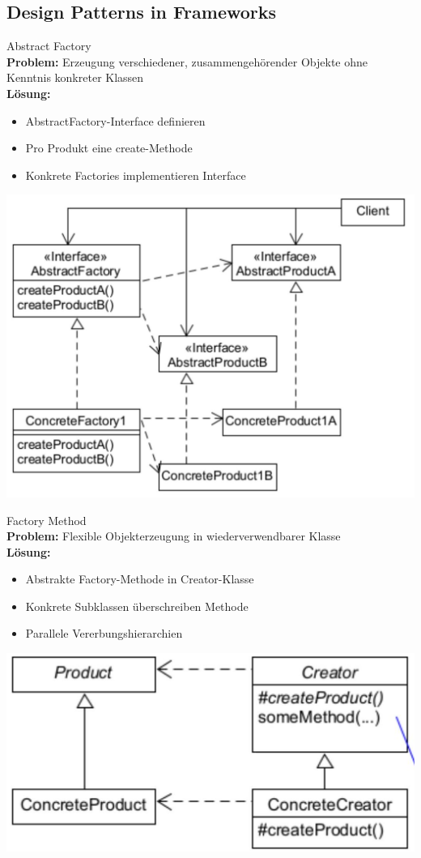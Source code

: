 \subsection{Design Patterns in Frameworks}

\begin{concept}{Abstract Factory}\\
\textbf{Problem:} Erzeugung verschiedener, zusammengehörender Objekte ohne Kenntnis konkreter Klassen\\
\textbf{Lösung:}
\begin{itemize}
    \item AbstractFactory-Interface definieren
    \item Pro Produkt eine create-Methode
    \item Konkrete Factories implementieren Interface
\end{itemize}
\includegraphics[width=0.8\linewidth]{images/2025_01_02_73d93f10fa91ab6123dcg-13}
\end{concept}



\begin{concept}{Factory Method}\\
\textbf{Problem:} Flexible Objekterzeugung in wiederverwendbarer Klasse\\
\textbf{Lösung:}
\begin{itemize}
    \item Abstrakte Factory-Methode in Creator-Klasse
    \item Konkrete Subklassen überschreiben Methode
    \item Parallele Vererbungshierarchien
\end{itemize}
\includegraphics[width=0.8\linewidth]{images/2025_01_02_73d93f10fa91ab6123dcg-16}
\end{concept}

